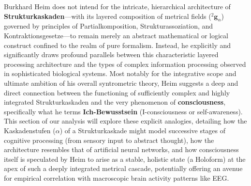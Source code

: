 \documentclass[
    12pt,              %
    a4paper,           %
    headings=normal,   %
    twoside=true,      %
    BCOR=8mm,          %
]{scrbook}
\newcommand{\kompositionsfeld}{{}^2\mathbf{g}}
\newcommand{\kaskadenstufe}{\alpha}
\begin{document}
Burkhard Heim does not intend for the intricate, hierarchical architecture of \textbf{Strukturkaskaden}—with its layered composition of metrical fields (\(\kompositionsfeld_\alpha\)) governed by principles of Partialkomposition, Strukturassoziation, and Kontraktionsgesetze—to remain merely an abstract mathematical or logical construct confined to the realm of pure formalism. Instead, he explicitly and significantly draws profound parallels between this characteristic layered processing architecture and the types of complex information processing observed in sophisticated biological systems. Most notably for the integrative scope and ultimate ambition of his overall syntrometric theory, Heim suggests a deep and direct connection between the functioning of sufficiently complex and highly integrated Strukturkaskaden and the very phenomenon of \textbf{consciousness}, specifically what he terms \textbf{Ich-Bewusstsein} (I-consciousness or self-awareness). This section of our analysis will explore these explicit analogies, detailing how the Kaskadenstufen (\(\kaskadenstufe\)) of a Strukturkaskade might model successive stages of cognitive processing (from sensory input to abstract thought), how the architecture resembles that of artificial neural networks, and how consciousness itself is speculated by Heim to arise as a stable, holistic state (a Holoform) at the apex of such a deeply integrated metrical cascade, potentially offering an avenue for empirical correlation with macroscopic brain activity patterns like EEG.
\end{document}
